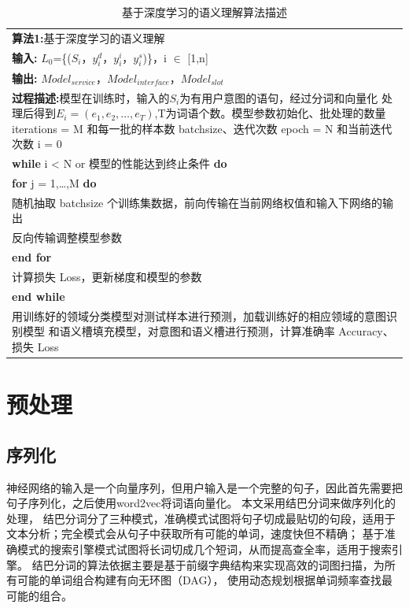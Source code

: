 \begin{table}[htb]
  \centering
  \caption{基于深度学习的语义理解算法描述}
  \label{tab:suanfa1}
\begin{tabular}{p{150mm}}
\toprule
\textbf{算法1:}基于深度学习的语义理解\\
\textbf{输入:} $L_0$=\{($S_i$，$y_i^d$，$y_i^i$，$y_i^s$)\}，i $\in$ [1,n]\\
\textbf{输出:} $Model_{service}$，$Model_{interface}$，$Model_{slot}$\\
\hline
\textbf{过程描述:}模型在训练时，输入的$S_i$为有用户意图的语句，经过分词和向量化
处理后得到$E_i=(e_1,e_2,\dots,e_T)$,T为词语个数。模型参数初始化、批处理的数量
iterations = M 和每一批的样本数 batchsize、迭代次数 epoch = N 和当前迭代次数 i = 0\\
\textbf{while} i < N or 模型的性能达到终止条件 \textbf{do}\\
\qquad \qquad \textbf{for} j = 1,\dots ,M \textbf{do}\\
\qquad \qquad \qquad \qquad 随机抽取 batchsize 个训练集数据，前向传输在当前网络权值和输入下网络的输出\\
\qquad \qquad \qquad \qquad 反向传输调整模型参数\\
\qquad \qquad \textbf{end for}\\
\qquad \qquad 计算损失 Loss，更新梯度和模型的参数\\
\textbf{end while}\\
用训练好的领域分类模型对测试样本进行预测，加载训练好的相应领域的意图识别模型
和语义槽填充模型，对意图和语义槽进行预测，计算准确率 Accuracy、损失 Loss\\
\bottomrule
\end{tabular}
\end{table}

\section{预处理}
\subsection{序列化}
神经网络的输入是一个向量序列，但用户输入是一个完整的句子，因此首先需要把句子序列化，之后使用word2vec将词语向量化。
本文采用结巴分词来做序列化的处理，
结巴分词分了三种模式，准确模式试图将句子切成最贴切的句段，适用于文本分析；完全模式会从句子中获取所有可能的单词，速度快但不精确；
基于准确模式的搜索引擎模式试图将长词切成几个短词，从而提高查全率，适用于搜索引擎。
结巴分词的算法依据主要是基于前缀字典结构来实现高效的词图扫描，为所有可能的单词组合构建有向无环图（DAG），
使用动态规划根据单词频率查找最可能的组合。

